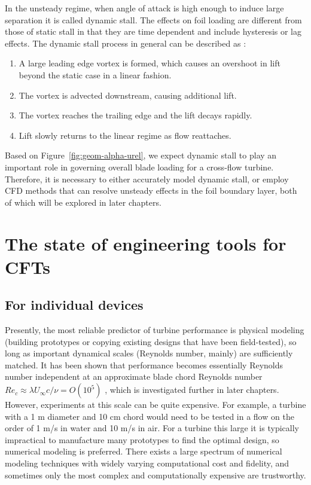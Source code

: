 In the unsteady regime, when angle of attack is high enough to induce large
separation it is called dynamic stall. The effects on foil loading are different
from those of static stall in that they are time dependent and include
hysteresis or lag effects. The dynamic stall process in general can be described
as \cite{McCroskey1981}:
\begin{enumerate}
    \item A large leading edge vortex is formed, which causes an overshoot in
    lift beyond the static case in a linear fashion.
    
    \item The vortex is advected downstream, causing additional lift.
    
    \item The vortex reaches the trailing edge and the lift decays rapidly.
    
    \item Lift slowly returns to the linear regime as flow reattaches.
\end{enumerate}

Based on Figure~\ref{fig:geom-alpha-urel}, we expect dynamic stall to play an
important role in governing overall blade loading for a cross-flow turbine.
Therefore, it is necessary to either accurately model dynamic stall, or employ
CFD methods that can resolve unsteady effects in the foil boundary layer, both
of which will be explored in later chapters.


\section{The state of engineering tools for CFTs}

\subsection{For individual devices}

Presently, the most reliable predictor of turbine performance is physical
modeling (building prototypes or copying existing designs that have been
field-tested), so long as important dynamical scales (Reynolds number, mainly)
are sufficiently matched. It has been shown that performance becomes essentially
Reynolds number independent at an approximate blade chord Reynolds number $Re_c
\approx \lambda U_\infty c / \nu = O(10^5)$ \cite{Bravo2007}, which is
investigated further in later chapters. However, experiments at this scale can
be quite expensive. For example, a turbine with a 1 m diameter and 10 cm chord
would need to be tested in a flow on the order of 1 m/s in water and 10 m/s in
air. For a turbine this large it is typically impractical to manufacture many
prototypes to find the optimal design, so numerical modeling is preferred. There
exists a large spectrum of numerical modeling techniques with widely varying
computational cost and fidelity, and sometimes only the most complex and
computationally expensive are trustworthy.

